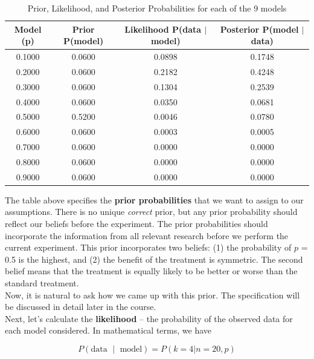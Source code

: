 \begin{table}[h]
    \centering
    \caption{Prior, Likelihood, and Posterior Probabilities for each of the 9 models}
    \vspace{5pt}
    \begin{tabularx}{\textwidth}{|c|c|c|c|}
        \hline
        \textbf{Model (p)} & \textbf{Prior P(model)} & \textbf{Likelihood P(data $\mid$ model)} & \textbf{Posterior P(model $\mid$ data)} \\
        \hline
        0.1000 & 0.0600 & 0.0898 & 0.1748 \\
        0.2000 & 0.0600 & 0.2182 & 0.4248 \\
        0.3000 & 0.0600 & 0.1304 & 0.2539 \\
        0.4000 & 0.0600 & 0.0350 & 0.0681 \\
        0.5000 & 0.5200 & 0.0046 & 0.0780 \\
        0.6000 & 0.0600 & 0.0003 & 0.0005 \\
        0.7000 & 0.0600 & 0.0000 & 0.0000 \\
        0.8000 & 0.0600 & 0.0000 & 0.0000 \\
        0.9000 & 0.0600 & 0.0000 & 0.0000 \\
        \hline
    \end{tabularx}
    \label{tab:bayesian_results}
\end{table}

The table above specifies the \textbf{prior probabilities} that we want to assign to our assumptions. There is no unique \textit{correct} prior, but any prior probability should reflect our beliefs before the experiment. The prior probabilities should incorporate the information from all relevant research before we perform the current experiment. This prior incorporates two beliefs: (1) the probability of $p$ = 0.5 is the highest, and (2) the benefit of the treatment is symmetric. The second belief means that the treatment is equally likely to be better or worse than the standard treatment.\\

Now, it is natural to ask how we came up with this prior. The specification will be discussed in detail later in the course.\\

Next, let’s calculate the \textbf{likelihood} – the probability of the observed data for each model considered. In mathematical terms, we have

\[
P(\text{data $\mid$ model}) = P(k = 4|n = 20, p)
\]

